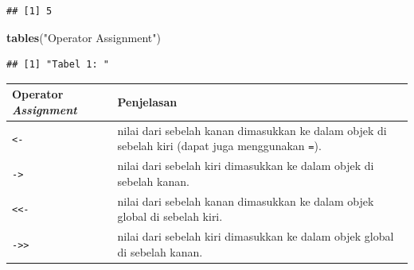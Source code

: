\documentclass[]{book}
\newenvironment{Shaded}{\begin{snugshade}}{\end{snugshade}}
\newcommand{\KeywordTok}[1]{\textcolor[rgb]{0.13,0.29,0.53}{\textbf{#1}}}
\newcommand{\NormalTok}[1]{#1}
\newcommand{\StringTok}[1]{\textcolor[rgb]{0.31,0.60,0.02}{#1}}
\begin{document}
\begin{verbatim}
## [1] 5
\end{verbatim}

\begin{Shaded}
\begin{Highlighting}[]
\KeywordTok{tables}\NormalTok{(}\StringTok{"Operator Assignment"}\NormalTok{)}
\end{Highlighting}
\end{Shaded}

\begin{verbatim}
## [1] "Tabel 1: "
\end{verbatim}

\begin{longtable}[]{@{}ll@{}}
\toprule
\begin{minipage}[b]{0.24\columnwidth}\raggedright
Operator \emph{Assignment}\strut
\end{minipage} & \begin{minipage}[b]{0.70\columnwidth}\raggedright
Penjelasan\strut
\end{minipage}\tabularnewline
\midrule
\endhead
\begin{minipage}[t]{0.24\columnwidth}\raggedright
\texttt{\textless{}-}\strut
\end{minipage} & \begin{minipage}[t]{0.70\columnwidth}\raggedright
nilai dari sebelah kanan dimasukkan ke dalam objek di sebelah kiri (dapat juga menggunakan \texttt{=}).\strut
\end{minipage}\tabularnewline
\begin{minipage}[t]{0.24\columnwidth}\raggedright
\texttt{-\textgreater{}}\strut
\end{minipage} & \begin{minipage}[t]{0.70\columnwidth}\raggedright
nilai dari sebelah kiri dimasukkan ke dalam objek di sebelah kanan.\strut
\end{minipage}\tabularnewline
\begin{minipage}[t]{0.24\columnwidth}\raggedright
\texttt{\textless{}\textless{}-}\strut
\end{minipage} & \begin{minipage}[t]{0.70\columnwidth}\raggedright
nilai dari sebelah kanan dimasukkan ke dalam objek global di sebelah kiri.\strut
\end{minipage}\tabularnewline
\begin{minipage}[t]{0.24\columnwidth}\raggedright
\texttt{-\textgreater{}\textgreater{}}\strut
\end{minipage} & \begin{minipage}[t]{0.70\columnwidth}\raggedright
nilai dari sebelah kiri dimasukkan ke dalam objek global di sebelah kanan.\strut
\end{minipage}\tabularnewline
\bottomrule
\end{longtable}
\end{document}
